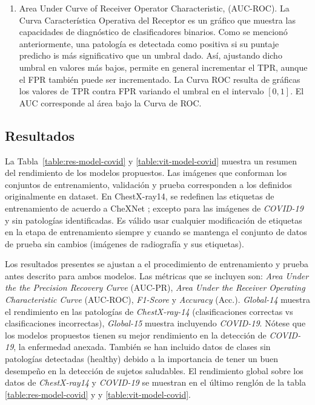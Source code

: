 {\begin{enumerate}
    \item  Area Under Curve of Receiver Operator Characteristic, (AUC-ROC). La Curva Característica
    Operativa del Receptor es un gráfico que muestra las capacidades de diagnóstico de clasificadores
    binarios. Como se mencionó anteriormente, una patología es detectada como positiva si su puntaje
    predicho is más significativo que un umbral dado. Así, ajustando dicho umbral en valores más
    bajos, permite en general incrementar el TPR, aunque el FPR también puede ser incrementado.
    La Curva ROC resulta de gráficas los valores de TPR contra FPR variando el umbral en el intervalo
    $[0,1]$. El AUC corresponde al área bajo la Curva de ROC.

\end{enumerate}


\subsection{Resultados}

La Tabla~\ref{table:res-model-covid} y \ref{table:vit-model-covid} muestra un resumen del rendimiento
de los modelos propuestos.
Las imágenes que conforman los conjuntos de entrenamiento, validación y prueba corresponden a los definidos
originalmente en dataset. En ChestX-ray14, se redefinen las etiquetas de entrenamiento de acuerdo a
CheXNet \cite{rajpurkar2018deep}; excepto para las imágenes de \textit{COVID-19} y sin patologías
identificadas. Es válido usar cualquier modificación de etiquetas en la etapa de entrenamiento
siempre y cuando se mantenga el conjunto de datos de prueba sin cambios (imágenes de radiografía y
sus etiquetas).

Los resultados presentes se ajustan a el procedimiento de entrenamiento y prueba antes descrito para
ambos modelos.
Las métricas que se incluyen son: \textit{Area Under the the Precision Recovery Curve} (AUC-PR),
\textit{Area Under the Receiver Operating Characteristic Curve} (AUC-ROC), \textit{F1-Score} y
\textit{Accuracy} (Acc.). \textit{Global-14} muestra el rendimiento en las patologías de
\textit{ChestX-ray-14} (clasificaciones correctas vs clasificaciones incorrectas), \textit{Global-15}
muestra incluyendo \textit{COVID-19}. Nótese que los modelos propuestos tienen su mejor
rendimiento en la detección de \textit{COVID-19}, la enfermedad anexada. También se han incluido
datos de clases sin patologías detectadas (healthy) debido a la importancia de tener un buen desempeño
en la detección de sujetos saludables. El rendimiento global sobre los datos de \textit{ChestX-ray14}
y \textit{COVID-19} se muestran en el último renglón de la tabla \ref{table:res-model-covid} y
y \ref{table:vit-model-covid}.

}

